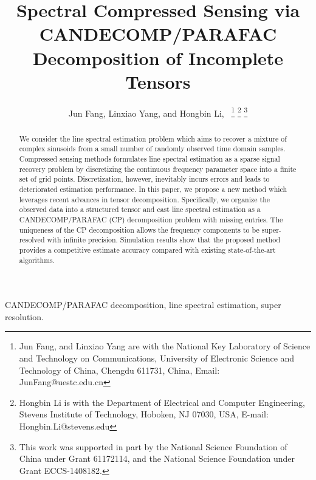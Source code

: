 \documentclass[10pt,journal,epsfig]{IEEEtran}
\begin{document}
\title{Spectral Compressed Sensing via CANDECOMP/PARAFAC Decomposition of Incomplete Tensors}

\author{Jun Fang, Linxiao Yang, and Hongbin Li,~
\thanks{Jun Fang, and Linxiao Yang are with the National Key Laboratory
of Science and Technology on Communications, University of
Electronic Science and Technology of China, Chengdu 611731, China,
Email: JunFang@uestc.edu.cn}
\thanks{Hongbin Li is
with the Department of Electrical and Computer Engineering,
Stevens Institute of Technology, Hoboken, NJ 07030, USA, E-mail:
Hongbin.Li@stevens.edu}
\thanks{This work was supported in part by the National Science
Foundation of China under Grant 61172114, and the National Science
Foundation under Grant ECCS-1408182. }}





\maketitle




\begin{abstract}
We consider the line spectral estimation problem which aims to
recover a mixture of complex sinusoids from a small number of
randomly observed time domain samples. Compressed sensing methods
formulates line spectral estimation as a sparse signal recovery
problem by discretizing the continuous frequency parameter space
into a finite set of grid points. Discretization, however,
inevitably incurs errors and leads to deteriorated estimation
performance. In this paper, we propose a new method which
leverages recent advances in tensor decomposition. Specifically,
we organize the observed data into a structured tensor and cast
line spectral estimation as a CANDECOMP/PARAFAC (CP) decomposition
problem with missing entries. The uniqueness of the CP
decomposition allows the frequency components to be super-resolved
with infinite precision. Simulation results show that the proposed
method provides a competitive estimate accuracy compared with
existing state-of-the-art algorithms.
\end{abstract}




\begin{keywords}
CANDECOMP/PARAFAC decomposition, line spectral estimation, super
resolution.
\end{keywords}
\end{document}
